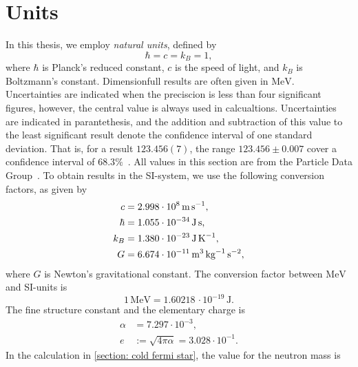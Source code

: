 \section{Units}
\label{section: units}

In this thesis, we employ \emph{natural units}, defined by
%
\begin{equation}
    \hbar = c = k_B = 1,
\end{equation}
%
where $\hbar$ is Planck's reduced constant, $c$ is the speed of light, and $k_B$ is Boltzmann's constant.
Dimensionfull results are often given in $\text{MeV}$.
Uncertainties are indicated when the preciscion is less than four significant figures, however, the central value is always used in calcualtions.
Uncertainties are indicated in parantethesis, and the addition and subtraction of this value to the least significant result denote the confidence interval of one standard deviation.
That is, for a result $123.456(7)$, the range $123.456\pm0.007$ cover a confidence interval of $68.3\%$~\autocite{particledatagroupReviewParticlePhysics2020}.
All values in this section are from the Particle Data Group~\cite{particledatagroupReviewParticlePhysics2020}.
To obtain results in the SI-system, we use the following conversion factors, as given by
%
\begin{align}
    \label{speed of ligh}
    c       &= 2.998 \cdot 10^8     \, \text{m} \, \text{s}^{-1}, \\
    \label{hbar}
    \hbar   &= 1.055 \cdot 10^{-34} \, \text{J} \, \text{s}, \\
    \label{Boltzmanns constat}
    k_B     &= 1.380 \cdot 10^{-23} \, \text{J} \, \text K^{-1}, \\
    \label{Newtons gravitational constant}
    G       &= 6.674 \cdot 10^{-11} \, \text m^3 \, \text{kg}^{-1} \, \text s^{-2},
\end{align}
%
where $G$ is Newton's gravitational constant.
The conversion factor between $\text{MeV}$ and SI-units is
%
\begin{equation}
    \label{electronvolt}
    1 \, \text{MeV} = 1.60218\, \cdot 10^{-19} \, \text{J}. 
\end{equation}
%
The fine structure constant and the elementary charge is
%
\begin{align}
    \label{Fine structure constant}
    \alpha &= 7.297 \cdot 10^{-3}, \\
    \label{Elementary charge}
    e &:= \sqrt{4 \pi \alpha} =  3.028\cdot 10^{-1}.
\end{align}
%
In the calculation in \autoref{section: cold fermi star}, the value for the neutron mass is
